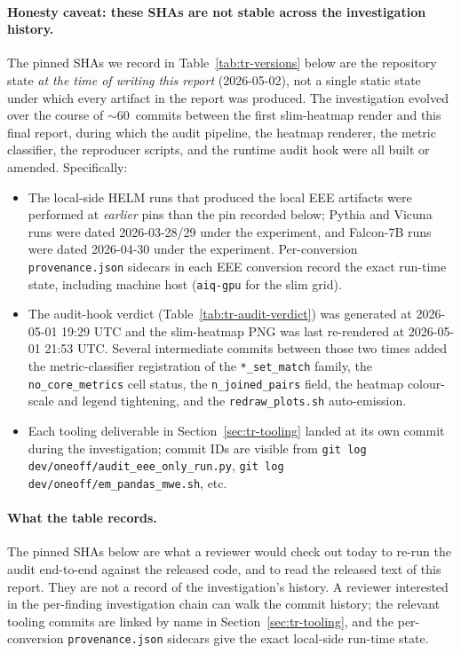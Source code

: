 \documentclass[11pt]{article}
\begin{document}
\paragraph{Honesty caveat: these SHAs are not stable across the
  investigation history.}
The pinned SHAs we record in Table~\ref{tab:tr-versions} below are the
  repository state \emph{at the time of writing this report}
  (2026-05-02), not a single static state under which every artifact
  in the report was produced.
The investigation evolved over the course of $\sim 60$~commits
  between the first slim-heatmap render and this final report,
  during which the audit pipeline, the heatmap renderer, the metric
  classifier, the reproducer scripts, and the runtime audit hook
  were all built or amended.
Specifically:
\begin{itemize}
  \item The local-side HELM runs that produced the local EEE
        artifacts were performed at \emph{earlier} 
        pins than the pin recorded below; Pythia and Vicuna runs
        were dated 2026-03-28/29 under the
         experiment, and Falcon-7B runs
        were dated 2026-04-30 under the
         experiment.
        Per-conversion \texttt{provenance.json} sidecars in each EEE
        conversion record the exact run-time state, including
        machine host (\texttt{aiq-gpu} for the slim grid).
  \item The audit-hook verdict
        (Table~\ref{tab:tr-audit-verdict}) was generated at
        2026-05-01 19:29 UTC and the slim-heatmap PNG was last
        re-rendered at 2026-05-01 21:53 UTC.
        Several intermediate commits between those two times added
        the metric-classifier registration of the
        \texttt{*\_set\_match} family, the \texttt{no\_core\_metrics}
        cell status, the \texttt{n\_joined\_pairs} field, the
        heatmap colour-scale and legend tightening, and the
        \texttt{redraw\_plots.sh} auto-emission.
  \item Each tooling deliverable in
        Section~\ref{sec:tr-tooling} landed at its own commit during
        the investigation; commit IDs are visible from
        \texttt{git log dev/oneoff/audit\_eee\_only\_run.py},
        \texttt{git log dev/oneoff/em\_pandas\_mwe.sh}, etc.
\end{itemize}

\paragraph{What the table records.}
The pinned SHAs below are what a reviewer would check out today to
  re-run the audit end-to-end against the released code, and to read
  the released text of this report.
They are not a record of the investigation's history.
A reviewer interested in the per-finding investigation chain can
  walk the commit history; the relevant tooling commits are linked
  by name in Section~\ref{sec:tr-tooling}, and the per-conversion
  \texttt{provenance.json} sidecars give the exact local-side run-time
  state.
\end{document}
